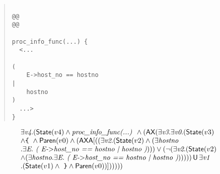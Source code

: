 \documentclass{article}
\newcommand{\U}{\,\mbox{\sf{U}}\,}
\newcommand{\A}{\mbox{\sf{A}}}
\newcommand{\AX}{\mbox{\sf{AX}}}
\newcommand{\mita}[1]{\mbox{\it{{#1}}}}
\newcommand{\msf}[1]{\mbox{\sf{{#1}}}}
\newcommand{\mth}[1]{\({#1}\)}
\newcommand{\ttlb}{\mbox{\tt \char'173}}
\newcommand{\ttrb}{\mbox{\tt \char'175}}
\begin{document}
\begin{quote}\begin{verbatim}

@@
@@

proc_info_func(...) {
  <...
    
(
    E->host_no == hostno
|
    hostno
)
  ...>
}
\end{verbatim}\end{quote}

\[\begin{array}{l}
\exists \mita{v4} . (\msf{State}(v4) \wedge \mita{proc\_info\_func(...) } \wedge (\AX(\exists \mita{v3} . \exists \mita{v0} . (\msf{State}(v3)\\ \wedge \mita{{\ttlb}
  } \wedge \msf{Paren}(v0) \wedge (\AX\A[((\exists \mita{v2} . (\msf{State}(v2) \wedge (\exists \mita{hostno}\\ . \exists \mita{E} . \mita{
(
E-\mth{>}host\_no == hostno
|
hostno
)}))) \vee (\neg (\exists \mita{v2} . (\msf{State}(v2)\\ \wedge (\exists \mita{hostno} . \exists \mita{E} . \mita{
(
E-\mth{>}host\_no == hostno
|
hostno
)}))))) \U \exists \mita{v1}\\ . (\msf{State}(v1) \wedge \mita{
{\ttrb}} \wedge \msf{Paren}(v0))]
)))))
\end{array}\]
\end{document}
